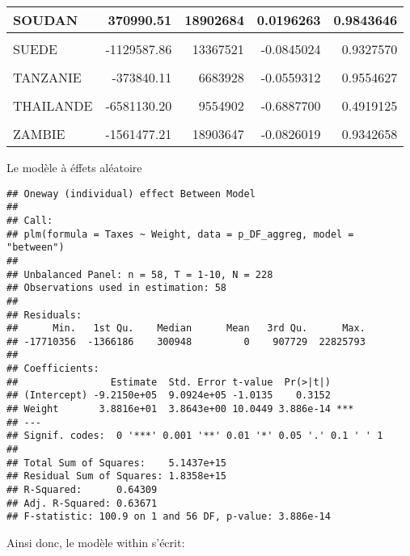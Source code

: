 \documentclass[
]{book}
\begin{document}
\begin{table}
\begin{tabular}[t]{l|r|r|r|r}
\hline
SOUDAN & 370990.51 & 18902684 & 0.0196263 & 0.9843646\\
\hline
\cellcolor{gray!6}{SUD SOUDAN} & \cellcolor{gray!6}{-3003470.69} & \cellcolor{gray!6}{18905608} & \cellcolor{gray!6}{-0.1588667} & \cellcolor{gray!6}{0.8739636}\\
\hline
SUEDE & -1129587.86 & 13367521 & -0.0845024 & 0.9327570\\
\hline
\cellcolor{gray!6}{Swaziland} & \cellcolor{gray!6}{-975538.34} & \cellcolor{gray!6}{7726665} & \cellcolor{gray!6}{-0.1262561} & \cellcolor{gray!6}{0.8996793}\\
\hline
TANZANIE & -373840.11 & 6683928 & -0.0559312 & 0.9554627\\
\hline
\cellcolor{gray!6}{TCHAD} & \cellcolor{gray!6}{127674.41} & \cellcolor{gray!6}{18902700} & \cellcolor{gray!6}{0.0067543} & \cellcolor{gray!6}{0.9946189}\\
\hline
THAILANDE & -6581130.20 & 9554902 & -0.6887700 & 0.4919125\\
\hline
\cellcolor{gray!6}{UNION EUROPEENNE} & \cellcolor{gray!6}{86341.53} & \cellcolor{gray!6}{18902832} & \cellcolor{gray!6}{0.0045677} & \cellcolor{gray!6}{0.9963609}\\
\hline
ZAMBIE & -1561477.21 & 18903647 & -0.0826019 & 0.9342658\\
\hline
\end{tabular}
\end{table}

Le modèle à éffets aléatoire

\begin{verbatim}
## Oneway (individual) effect Between Model
## 
## Call:
## plm(formula = Taxes ~ Weight, data = p_DF_aggreg, model = "between")
## 
## Unbalanced Panel: n = 58, T = 1-10, N = 228
## Observations used in estimation: 58
## 
## Residuals:
##      Min.   1st Qu.    Median      Mean   3rd Qu.      Max. 
## -17710356  -1366186    300948         0    907729  22825793 
## 
## Coefficients:
##                Estimate  Std. Error t-value  Pr(>|t|)    
## (Intercept) -9.2150e+05  9.0924e+05 -1.0135    0.3152    
## Weight       3.8816e+01  3.8643e+00 10.0449 3.886e-14 ***
## ---
## Signif. codes:  0 '***' 0.001 '**' 0.01 '*' 0.05 '.' 0.1 ' ' 1
## 
## Total Sum of Squares:    5.1437e+15
## Residual Sum of Squares: 1.8358e+15
## R-Squared:      0.64309
## Adj. R-Squared: 0.63671
## F-statistic: 100.9 on 1 and 56 DF, p-value: 3.886e-14
\end{verbatim}

Ainsi donc, le modèle within s'écrit:
\end{document}
